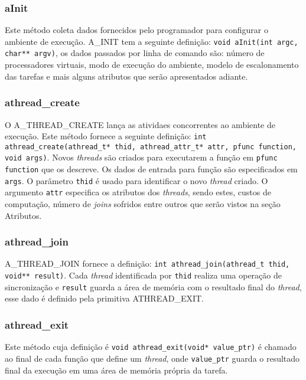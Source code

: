\documentclass[12pt]{article}
\begin{document}
\subsubsection*{aInit}

Este método coleta dados fornecidos pelo programador para configurar o ambiente de execução. A\_INIT tem a seguinte definição: 
\texttt{void aInit(int argc, char** argv)}, os dados passados por linha de comando são: número de processadores virtuais, modo de 
execução do ambiente, modelo de escalonamento das tarefas e mais alguns atributos que serão apresentados adiante.

\subsubsection*{athread\_create}

O A\_THREAD\_CREATE lança as atividaes concorrentes ao ambiente de execução. Este método fornece a seguinte definição: 
\texttt{int athread\_create(athread\_t* thid, athread\_attr\_t* attr, pfunc function, void\* args)}. Novos \emph{threads} são criados
para executarem a função em \texttt{pfunc function} que os descreve. Os dados de entrada para função são especificados em \texttt{args}.
O parâmetro \texttt{thid} é usado para identificar o novo \emph{thread} criado. O argumento \texttt{attr} especifica os atributos dos 
\emph{threads}, sendo estes, custos de computação, número de \emph{joins} sofridos entre outros que serão vistos na seção Atributos.

\subsubsection*{athread\_join}

A\_THREAD\_JOIN fornece a definição: \texttt{int athread\_join(athread\_t thid, void** result)}. Cada \emph{thread} identificada por
\texttt{thid} realiza uma operação de sincronização e \texttt{result} guarda a área de memória com o resultado final do \emph{thread}, 
esse dado é definido pela primitiva ATHREAD\_EXIT.

\subsubsection*{athread\_exit}

Este método cuja definição é \texttt{void athread\_exit(void* value\_ptr)} é chamado ao final de cada função que define um \emph{thread},
onde \texttt{value\_ptr} guarda o resultado final da execução em uma área de memória própria da tarefa.
\end{document}
